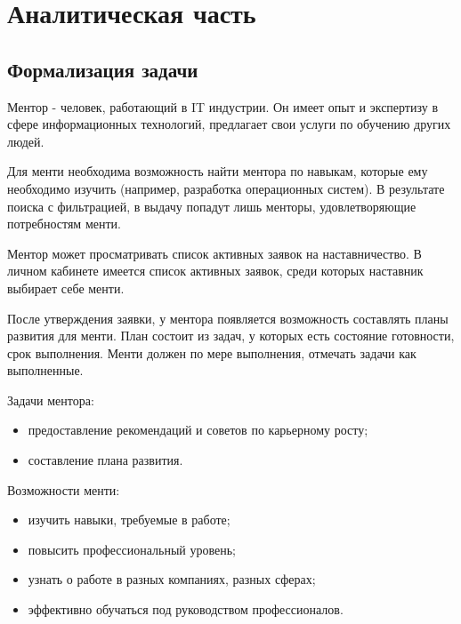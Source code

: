 \chapter{Аналитическая часть}
%

\section{Формализация задачи}

Ментор - человек, работающий в IT индустрии. Он имеет опыт и экспертизу в сфере информационных технологий, предлагает свои услуги по обучению других людей.

Для менти необходима возможность найти ментора по навыкам, которые ему необходимо изучить (например, разработка операционных систем). В результате поиска с фильтрацией, в выдачу попадут лишь менторы, удовлетворяющие потребностям менти.

Ментор может просматривать список активных заявок на наставничество.
В личном кабинете имеется список активных заявок, среди которых наставник выбирает себе менти.


После утверждения заявки, у ментора появляется возможность составлять планы развития для менти.
План состоит из задач, у которых есть состояние готовности, срок выполнения.
Менти должен по мере выполнения, отмечать задачи как выполненные.
%

Задачи ментора:
\begin{itemize}
    \item предоставление рекомендаций и советов по карьерному росту;
    \item составление плана развития.
\end{itemize}

Возможности менти:
\begin{itemize}
    \item изучить навыки, требуемые в работе;
    \item повысить профессиональный уровень;
    \item узнать о работе в разных компаниях, разных сферах;
    \item эффективно обучаться под руководством профессионалов.
\end{itemize}

